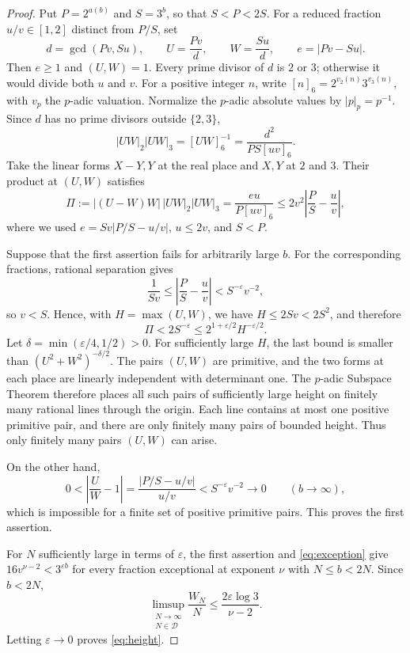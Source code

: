 \documentclass[11pt,reqno]{amsart}
\theoremstyle{definition}
\newcommand{\N}{\mathbb N}
\newcommand{\DD}{\mathcal D}
\begin{document}
\begin{proof}
Put $P=2^{a(b)}$ and $S=3^b$, so that $S<P<2S$.
For a reduced fraction $u/v\in[1,2]$ distinct from
$P/S$, set
\[
 d=\gcd(Pv,Su),\qquad
 U=\frac{Pv}{d},\qquad W=\frac{Su}{d},\qquad
 e=|Pv-Su|.
\]
Then $e\ge1$ and $(U,W)=1$. Every prime divisor
of $d$ is $2$ or $3$; otherwise it would divide
both $u$ and $v$. For a positive integer $n$,
write $[n]_6=2^{v_2(n)}3^{v_3(n)}$, with $v_p$
the $p$-adic valuation. Normalize the $p$-adic
absolute values by $|p|_p=p^{-1}$. Since $d$
has no prime divisors outside $\{2,3\}$,
\[
 |UW|_2|UW|_3=[UW]_6^{-1}
 =\frac{d^2}{PS[uv]_6}.
\]
Take the linear forms $X-Y,Y$ at the real place
and $X,Y$ at $2$ and $3$. Their product at $(U,W)$
satisfies
\[
 \Pi:=|(U-W)W|\,|UW|_2|UW|_3
 =\frac{eu}{P[uv]_6}
 \le2v^2\left|\frac PS-\frac uv\right|,
\]
where we used $e=Sv|P/S-u/v|$, $u\le2v$, and $S<P$.

Suppose that the first assertion fails for arbitrarily
large $b$. For the corresponding fractions, rational
separation gives
\[
 \frac1{Sv}\le\left|\frac PS-\frac uv\right|
 <S^{-\varepsilon}v^{-2},
\]
so $v<S$. Hence, with $H=\max(U,W)$, we have
$H\le2Sv<2S^2$, and therefore
\[
 \Pi<2S^{-\varepsilon}
 \le2^{1+\varepsilon/2}H^{-\varepsilon/2}.
\]
Let $\delta=\min(\varepsilon/4,1/2)>0$. For
sufficiently large $H$, the last bound is smaller
than $(U^2+W^2)^{-\delta/2}$. The pairs $(U,W)$
are primitive, and the two forms at each place
are linearly independent with determinant one.
The $p$-adic Subspace Theorem
\cite[p.~246, (1.3)--(1.5)]{Schlickewei} therefore
places all such pairs of sufficiently large height
on finitely many rational lines through the origin.
Each line contains at most one positive primitive
pair, and there are only finitely many pairs of
bounded height. Thus only finitely many pairs
$(U,W)$ can arise.

On the other hand,
\[
 0<\left|\frac UW-1\right|
 =\frac{|P/S-u/v|}{u/v}
 <S^{-\varepsilon}v^{-2}\longrightarrow0
 \qquad(b\to\infty),
\]
which is impossible for a finite set of positive
primitive pairs. This proves the first assertion.

For $N$ sufficiently large in terms of $\varepsilon$,
the first assertion and \eqref{eq:exception} give
$16v^{\nu-2}<3^{\varepsilon b}$ for every fraction
exceptional at exponent $\nu$ with $N\le b<2N$.
Since $b<2N$,
\[
 \limsup_{\substack{N\to\infty\\N\in\DD}}
 \frac{W_N}{N}
 \le\frac{2\varepsilon\log3}{\nu-2}.
\]
Letting $\varepsilon\to0$ proves \eqref{eq:height}.
\end{proof}
\end{document}
